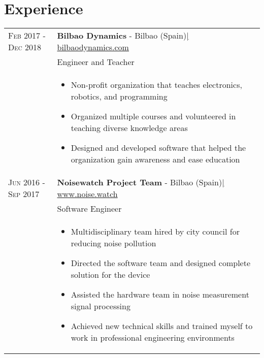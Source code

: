 \documentclass[a4paper,10pt]{article}
\begin{document}


\section{Experience}
\begin{tabular}{p{3.2cm}p{13.1cm}}

 \textsc{Feb 2017 - Dec 2018}& \textbf{Bilbao Dynamics} - Bilbao (Spain)\href{https://bilbaodynamics.com/}{\hfill | \footnotesize bilbaodynamics.com}\\
 & Engineer and Teacher \\ 
 & \footnotesize{ \begin{itemize}[noitemsep,topsep=3pt]
 \vspace{-0.1in}
 \item Non-profit organization that teaches electronics, robotics, and programming
 \item Organized multiple courses and volunteered in teaching diverse knowledge areas
 \item Designed and developed software that helped the organization gain awareness and ease education

 \end{itemize}} \vspace{-0.09in} \\ 

 \textsc{Jun 2016 - Sep 2017}& \textbf{Noisewatch Project Team} - Bilbao (Spain)\href{http://noise.watch}{\hfill | \footnotesize www.noise.watch}\\
 & Software Engineer \\
 & \footnotesize{ \begin{itemize}[noitemsep,topsep=3pt]
 \vspace{-0.1in}
 \item Multidisciplinary team hired by city council for reducing noise pollution
 \item Directed the software team and designed complete solution for the device
 \item Assisted the hardware team in noise measurement signal processing
 \item Achieved new technical skills and trained myself to work in professional engineering environments
 \end{itemize}} \\


\end{tabular}
\end{document}
